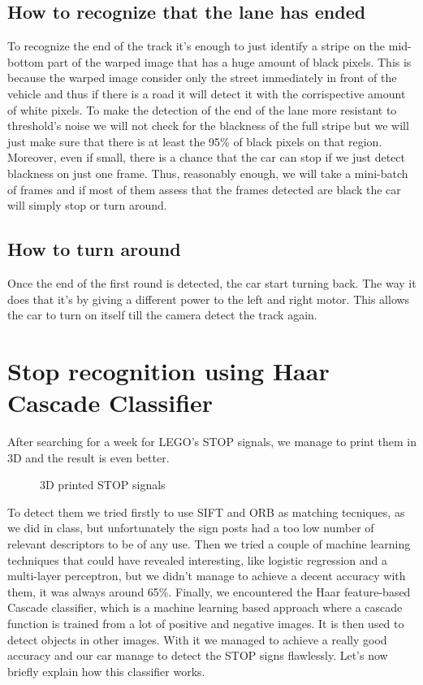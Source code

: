 \documentclass[12pt,a4paper]{article}
\begin{document}
\begin{large}
\subsection{How to recognize that the lane has ended}
To recognize the end of the track it's enough to just identify a stripe on the mid-bottom part of the warped image that has a huge amount of black pixels. This is because the warped image consider only the street immediately in front of the vehicle and thus if there is a road it will detect it with the corrispective amount of white pixels. To make the detection of the end of the lane more resistant to threshold's noise we will not check for the blackness of the full stripe but we will just make sure that there is at least the 95\% of black pixels on that region. \\
Moreover, even if small, there is a chance that the car can stop if we just detect blackness on just one frame. Thus, reasonably enough, we will take a mini-batch of frames and if most of them assess that the frames detected are black the car will simply stop or turn around.  

\subsection{How to turn around}
Once the end of the first round is detected, the car start turning back. The way it does that it's by giving a different power to the left and right motor. This allows the car to turn on itself till the camera detect the track again.\\


\section{Stop recognition using Haar Cascade Classifier}
After searching for a week for LEGO's STOP signals, we manage to print them in 3D and the result is even better.\par
\begin{figure} [!h]
  \centering
  \captionsetup{justification=centering}
  \caption{3D printed STOP signals}
  \end{figure}
To detect them we tried firstly to use SIFT and ORB as matching tecniques, as we did in class, but unfortunately the sign posts had a too low number of relevant descriptors to be of any use.
Then we tried a couple of machine learning techniques that could have revealed interesting, like logistic regression and a multi-layer perceptron, but we didn't manage to achieve a decent accuracy with them, it was always around 65\%.
Finally, we encountered the Haar feature-based Cascade classifier, which is a machine learning based approach where a cascade function is trained from a lot of positive and negative images. It is then used to detect objects in other images. With it we managed to achieve a really good accuracy and our car manage to detect the STOP signs flawlessly. Let's now briefly explain how this classifier works.



\end{large}
\end{document}
